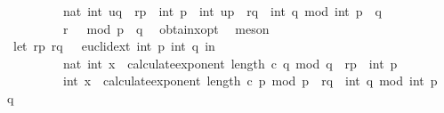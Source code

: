 \begin{isabellebody}
\ \ \ \ \ \ \ \ \ nat\ {\isacharparenleft}{\kern0pt}{\isacharparenleft}{\kern0pt}int\ u{\isacharunderscore}{\kern0pt}q\ {\isacharasterisk}{\kern0pt}\ r{\isacharunderscore}{\kern0pt}p\ {\isacharasterisk}{\kern0pt}\ int\ p\ {\isacharplus}{\kern0pt}\ int\ u{\isacharunderscore}{\kern0pt}p\ {\isacharasterisk}{\kern0pt}\ r{\isacharunderscore}{\kern0pt}q\ {\isacharasterisk}{\kern0pt}\ int\ q{\isacharparenright}{\kern0pt}\ mod\ int\ {\isacharparenleft}{\kern0pt}p\ {\isacharasterisk}{\kern0pt}\ q{\isacharparenright}{\kern0pt}{\isacharparenright}{\kern0pt}{\isacharparenright}{\kern0pt}\ {\isacharequal}{\kern0pt}\isanewline
\ \ \ \ \ \ \ \ \ r\ {\isacharcircum}{\kern0pt}\ {}\ mod\ {\isacharparenleft}{\kern0pt}p\ {\isacharasterisk}{\kern0pt}\ q{\isacharparenright}{\kern0pt}{\isachardoublequoteclose}\ \isamarkupfalse%
\ obtain{\isacharunderscore}{\kern0pt}x{\isacharunderscore}{\kern0pt}opt{}\ \isamarkupfalse%
\ meson\isanewline
\isanewline
\ \ \isamarkupfalse%
\ \isamarkupfalse%
\ {\isachardoublequoteopen}{\isacharparenleft}{\kern0pt}let\ {\isacharparenleft}{\kern0pt}{\isacharparenleft}{\kern0pt}r{\isacharunderscore}{\kern0pt}p{\isacharcomma}{\kern0pt}\ r{\isacharunderscore}{\kern0pt}q{\isacharparenright}{\kern0pt}{\isacharcomma}{\kern0pt}\ {\isacharunderscore}{\kern0pt}{\isacharparenright}{\kern0pt}\ {\isacharequal}{\kern0pt}\ euclid{\isacharunderscore}{\kern0pt}ext\ {\isacharparenleft}{\kern0pt}int\ p{\isacharparenright}{\kern0pt}\ {\isacharparenleft}{\kern0pt}int\ q{\isacharparenright}{\kern0pt}\ in\isanewline
\ \ \ \ \ \ \ \ \ nat\ {\isacharparenleft}{\kern0pt}{\isacharparenleft}{\kern0pt}int\ {\isacharparenleft}{\kern0pt}x\ {\isacharcircum}{\kern0pt}\ calculate{\isacharunderscore}{\kern0pt}exponent\ {\isacharparenleft}{\kern0pt}length\ c{\isacharparenright}{\kern0pt}\ q\ mod\ q{\isacharparenright}{\kern0pt}\ {\isacharasterisk}{\kern0pt}\ r{\isacharunderscore}{\kern0pt}p\ {\isacharasterisk}{\kern0pt}\ int\ p\ \isanewline
\ \ \ \ \ \ \ \ {\isacharplus}{\kern0pt}\ int\ {\isacharparenleft}{\kern0pt}x\ {\isacharcircum}{\kern0pt}\ calculate{\isacharunderscore}{\kern0pt}exponent\ {\isacharparenleft}{\kern0pt}length\ c{\isacharparenright}{\kern0pt}\ p\ mod\ p{\isacharparenright}{\kern0pt}\ {\isacharasterisk}{\kern0pt}\ r{\isacharunderscore}{\kern0pt}q\ {\isacharasterisk}{\kern0pt}\ int\ q{\isacharparenright}{\kern0pt}\ mod\ int\ {\isacharparenleft}{\kern0pt}p\ {\isacharasterisk}{\kern0pt}\ q{\isacharparenright}{\kern0pt}{\isacharparenright}{\kern0pt}{\isacharparenright}{\kern0pt}\ {\isacharequal}{\kern0pt}\isanewline

\end{isabellebody}
